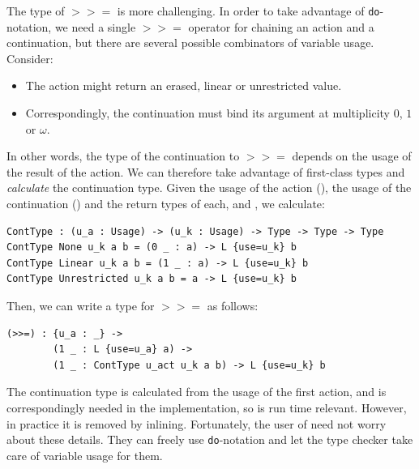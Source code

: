 The type of $\mathtt{>>=}$ is more challenging. In order to take advantage of
\texttt{do}-notation, we need a single $\mathtt{>>=}$ operator for chaining
an action and a continuation, but there
are several possible combinators of variable usage. Consider:

\begin{itemize}
\item The action might return an erased, linear or unrestricted value.
\item Correspondingly, the continuation must bind its argument at multiplicity
$0$, $1$ or $\omega$.
\end{itemize}

In other words, the type of the continuation to $\mathtt{>>=}$ depends on the
usage of the result of the action. We can therefore take advantage of
first-class types and \emph{calculate} the continuation type. Given the
usage of the action (), the usage of the continuation ()
and the return types of each,  and , we calculate:

\begin{lstlisting}
ContType : (u_a : Usage) -> (u_k : Usage) -> Type -> Type -> Type
ContType None u_k a b = (0 _ : a) -> L {use=u_k} b
ContType Linear u_k a b = (1 _ : a) -> L {use=u_k} b
ContType Unrestricted u_k a b = a -> L {use=u_k} b
\end{lstlisting}

Then, we can write a type for $\mathtt{>>=}$ as follows:

\begin{lstlisting}
(>>=) : {u_a : _} ->
        (1 _ : L {use=u_a} a) ->
        (1 _ : ContType u_act u_k a b) -> L {use=u_k} b
\end{lstlisting}

The continuation type is calculated from the usage of the first action, and is
correspondingly needed in the implementation, so  is run time
relevant. However, in practice it is removed by inlining.
Fortunately, the user of  need not worry about these details. They
can freely use \texttt{do}-notation and let the type checker take care of
variable usage for them.



